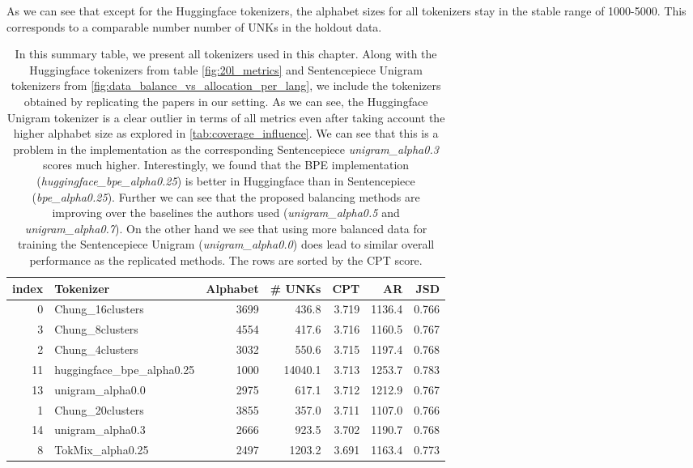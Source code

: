 As we can see that except for the Huggingface tokenizers, the alphabet sizes for all tokenizers stay in the stable range of 1000-5000. This corresponds to a comparable number number of UNKs in the holdout data.


\begin{table}
\caption{In this summary table, we present all tokenizers used in this chapter. Along with the Huggingface tokenizers from table \ref{fig:20l_metrics} and Sentencepiece Unigram tokenizers from \ref{fig:data_balance_vs_allocation_per_lang}, we include the tokenizers obtained by replicating the papers \citet{chung_improving_2020,zheng_allocating_2021,liang_xlm-v_2023} in our setting. As we can see, the Huggingface Unigram tokenizer is a clear outlier in terms of all metrics even after taking account the higher alphabet size as explored in \ref{tab:coverage_influence}. We can see that this is a problem in the implementation as the corresponding Sentencepiece \textit{unigram\_alpha0.3} scores much higher. Interestingly, we found that the BPE implementation (\textit{huggingface\_bpe\_alpha0.25}) is better in Huggingface than in Sentencepiece (\textit{bpe\_alpha0.25}). Further we can see that the proposed balancing methods are improving over the baselines the authors used (\textit{unigram\_alpha0.5} and \textit{unigram\_alpha0.7}). On the other hand we see that using more balanced data for training the Sentencepiece Unigram (\textit{unigram\_alpha0.0}) does lead to similar overall performance as the replicated methods.
The rows are sorted by the CPT score.}
\label{tab:all_tokenizers_metrics}
\begin{tabular}{rlrrrrr}
\toprule
index & Tokenizer & Alphabet & \# UNKs & CPT & AR & JSD \\
\midrule
0 & Chung\_16clusters & 3699 & 436.8 & 3.719 & 1136.4 & 0.766 \\
3 & Chung\_8clusters & 4554 & 417.6 & 3.716 & 1160.5 & 0.767 \\
2 & Chung\_4clusters & 3032 & 550.6 & 3.715 & 1197.4 & 0.768 \\
11 & huggingface\_bpe\_alpha0.25 & 1000 & 14040.1 & 3.713 & 1253.7 & 0.783 \\
13 & unigram\_alpha0.0 & 2975 & 617.1 & 3.712 & 1212.9 & 0.767 \\
1 & Chung\_20clusters & 3855 & 357.0 & 3.711 & 1107.0 & 0.766 \\
14 & unigram\_alpha0.3 & 2666 & 923.5 & 3.702 & 1190.7 & 0.768 \\
8 & TokMix\_alpha0.25 & 2497 & 1203.2 & 3.691 & 1163.4 & 0.773 \\

\end{tabular}
\end{table}
